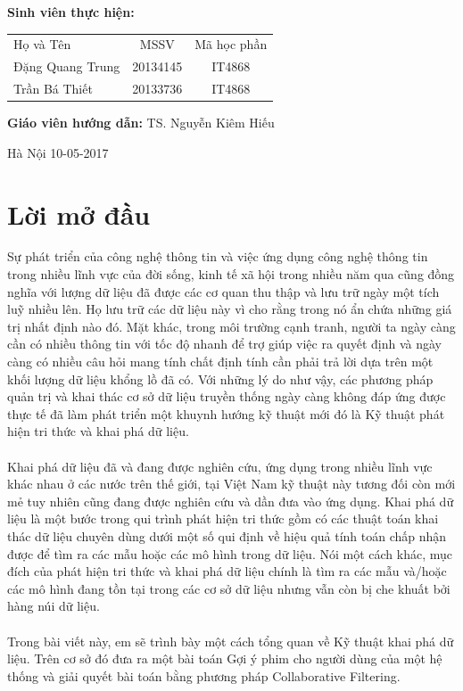 \documentclass[a4paper,11pt]{report}
\begin{document}
\hspace{1cm}\fontsize{14}{16}\selectfont \textbf{Sinh viên thực hiện:}
\begin{longtable}{l c c }
Họ và Tên & MSSV &    Mã học phần \\[0.5cm]
Đặng Quang Trung &    20134145 & IT4868\\
Trần Bá Thiết & 20133736 &IT4868
\end{longtable}
\hspace{0.3cm}\fontsize{14}{16}\selectfont \textbf{Giáo viên hướng dẫn:} TS. Nguyễn Kiêm Hiếu\\[1.0cm]
\begin{center}
\fontsize{16}{19}\selectfont Hà Nội 10-05-2017
\end{center} 
\tableofcontents
\chapter*{Lời mở đầu}
Sự phát triển của công nghệ thông tin và việc ứng dụng công nghệ thông tin trong nhiều
lĩnh vực của đời sống, kinh tế xã hội trong nhiều năm qua cũng đồng nghĩa với lượng dữ
liệu đã được các cơ quan thu thập và lưu trữ ngày một tích luỹ nhiều lên. Họ lưu trữ các
dữ liệu này vì cho rằng trong nó ẩn chứa những giá trị nhất định nào đó. Mặt khác, trong
môi trường cạnh tranh, người ta ngày càng cần có nhiều thông tin với tốc độ nhanh để trợ
giúp việc ra quyết định và ngày càng có nhiều câu hỏi mang tính chất định tính cần phải
trả lời dựa trên một khối lượng dữ liệu khổng lồ đã có. Với những lý do như vậy, các
phương pháp quản trị và khai thác cơ sở dữ liệu truyền thống ngày càng không đáp ứng
được thực tế đã làm phát triển một khuynh hướng kỹ thuật mới đó là Kỹ thuật phát hiện
tri thức và khai phá dữ liệu. \\ \\ 
Khai phá dữ liệu đã và đang được nghiên cứu, ứng dụng trong nhiều lĩnh vực khác nhau
ở các nước trên thế giới, tại Việt Nam kỹ thuật này tương đối còn mới mẻ tuy nhiên cũng
đang được nghiên cứu và dần đưa vào ứng dụng. Khai phá dữ liệu là một bước trong qui
trình phát hiện tri thức gồm có các thuật toán khai thác dữ liệu chuyên dùng dưới một số
qui định về hiệu quả tính toán chấp nhận được để tìm ra các mẫu hoặc các mô hình trong
dữ liệu. Nói một cách khác, mục đích của phát hiện tri thức và khai phá dữ liệu chính là
tìm ra các mẫu và/hoặc các mô hình đang tồn tại trong các cơ sở dữ liệu nhưng vẫn còn bị
che khuất bởi hàng núi dữ liệu. \\ \\ 
Trong bài viết này, em sẽ trình bày một cách tổng quan về Kỹ thuật khai phá dữ liệu.
Trên cơ sở đó đưa ra một bài toán Gợi ý phim cho người dùng của một hệ thống và giải
quyết bài toán bằng phương pháp Collaborative Filtering. 
\end{document}
